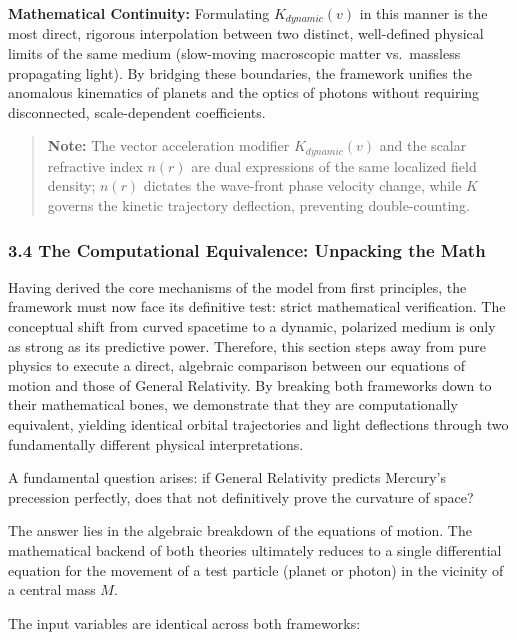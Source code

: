 \documentclass[twocolumn]{article}
\begin{document}
\textbf{Mathematical Continuity:} Formulating \(K_{dynamic}(v)\) in this
manner is the most direct, rigorous interpolation between two distinct,
well-defined physical limits of the same medium (slow-moving macroscopic
matter vs.~massless propagating light). By bridging these boundaries,
the framework unifies the anomalous kinematics of planets and the optics
of photons without requiring disconnected, scale-dependent coefficients.

\begin{quote}
\textbf{Note:} The vector acceleration modifier \(K_{dynamic}(v)\) and
the scalar refractive index \(n(r)\) are dual expressions of the same
localized field density; \(n(r)\) dictates the wave-front phase velocity
change, while \(K\) governs the kinetic trajectory deflection,
preventing double-counting.
\end{quote}

\subsubsection{3.4 The Computational Equivalence: Unpacking the
Math}\label{the-computational-equivalence-unpacking-the-math}

Having derived the core mechanisms of the model from first principles,
the framework must now face its definitive test: strict mathematical
verification. The conceptual shift from curved spacetime to a dynamic,
polarized medium is only as strong as its predictive power. Therefore,
this section steps away from pure physics to execute a direct, algebraic
comparison between our equations of motion and those of General
Relativity. By breaking both frameworks down to their mathematical
bones, we demonstrate that they are computationally equivalent, yielding
identical orbital trajectories and light deflections through two
fundamentally different physical interpretations.

A fundamental question arises: if General Relativity predicts Mercury's
precession perfectly, does that not definitively prove the curvature of
space?

The answer lies in the algebraic breakdown of the equations of motion.
The mathematical backend of both theories ultimately reduces to a single
differential equation for the movement of a test particle (planet or
photon) in the vicinity of a central mass \(M\).

The input variables are identical across both frameworks:
\end{document}

